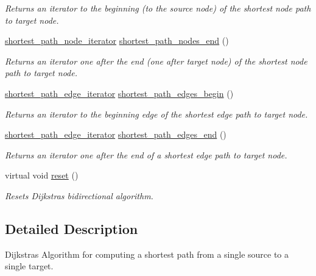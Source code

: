 \begin{DoxyCompactItemize}
\begin{DoxyCompactList}\small\item\em Returns an iterator to the beginning (to the source node) of the shortest node path to target node. \end{DoxyCompactList}\item 
\mbox{\hyperlink{classbid__dijkstra_ada2e642d9f0582d30fe1dd51c4aa1899}{shortest\+\_\+path\+\_\+node\+\_\+iterator}} \mbox{\hyperlink{classbid__dijkstra_af06035d39e06a70a1c44f1c60c347c5a}{shortest\+\_\+path\+\_\+nodes\+\_\+end}} ()
\begin{DoxyCompactList}\small\item\em Returns an iterator one after the end (one after target node) of the shortest node path to target node. \end{DoxyCompactList}\item 
\mbox{\hyperlink{classbid__dijkstra_a703d0faf9568bc25a9305faa61412fe1}{shortest\+\_\+path\+\_\+edge\+\_\+iterator}} \mbox{\hyperlink{classbid__dijkstra_a177bf7ffd4bf83ce364076ab5183dc3e}{shortest\+\_\+path\+\_\+edges\+\_\+begin}} ()
\begin{DoxyCompactList}\small\item\em Returns an iterator to the beginning edge of the shortest edge path to target node. \end{DoxyCompactList}\item 
\mbox{\hyperlink{classbid__dijkstra_a703d0faf9568bc25a9305faa61412fe1}{shortest\+\_\+path\+\_\+edge\+\_\+iterator}} \mbox{\hyperlink{classbid__dijkstra_a0c31fda13205cd7905ff2400c60bb5e2}{shortest\+\_\+path\+\_\+edges\+\_\+end}} ()
\begin{DoxyCompactList}\small\item\em Returns an iterator one after the end of a shortest edge path to target node. \end{DoxyCompactList}\item 
virtual void \mbox{\hyperlink{classbid__dijkstra_a6df2769941bc73fc5626b084745a2258}{reset}} ()
\begin{DoxyCompactList}\small\item\em Resets Dijkstra\textquotesingle{}s bidirectional algorithm. \end{DoxyCompactList}\end{DoxyCompactItemize}


\subsection{Detailed Description}
Dijkstra\textquotesingle{}s Algorithm for computing a shortest path from a single source to a single target. 

